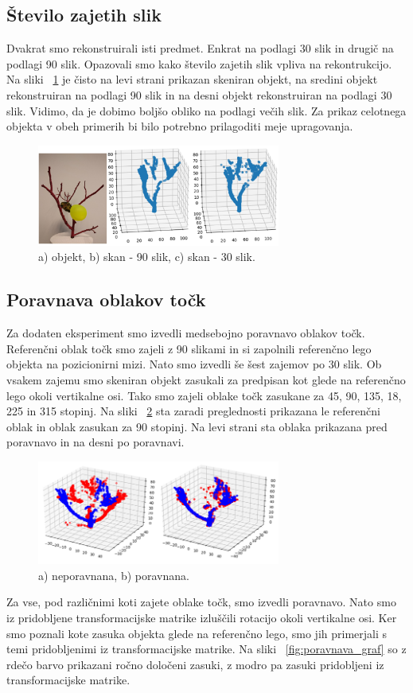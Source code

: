 \documentclass[journal,a4paper,twoside]{sty/IEEEtran}
\begin{document}
\subsection{Število zajetih slik}
Dvakrat smo rekonstruirali isti predmet. Enkrat na podlagi 30 slik in drugič na podlagi 90 slik. Opazovali smo kako število zajetih slik vpliva na rekontrukcijo. Na sliki ~\ref{fig:slika_90_30} je čisto na levi strani prikazan skeniran objekt, na sredini objekt rekonstruiran na podlagi 90 slik in na desni objekt rekonstruiran na podlagi 30 slik. Vidimo, da je dobimo boljšo obliko na podlagi večih slik. Za prikaz celotnega objekta v obeh primerih bi bilo potrebno prilagoditi meje upragovanja. 
%
\begin{figure}[H]
	\centerline{\includegraphics[width=8cm]{fig/slika_90_30}}
	\caption{a) objekt, b) skan - 90 slik, c) skan - 30 slik.}
	\label{fig:slika_90_30}
\end{figure}
%
%
\subsection{Poravnava oblakov točk}
Za dodaten eksperiment smo izvedli medsebojno poravnavo oblakov točk. Referenčni oblak točk smo zajeli z 90 slikami in si zapolnili referenčno lego objekta na pozicionirni mizi. Nato smo izvedli še šest zajemov po 30 slik. Ob vsakem zajemu smo skeniran objekt zasukali za predpisan kot glede na referenčno lego okoli vertikalne osi. Tako smo zajeli oblake točk zasukane za 45, 90, 135, 18, 225 in 315 stopinj. Na sliki ~\ref{fig:poravnava} sta zaradi preglednosti prikazana le referenčni oblak in oblak zasukan za 90 stopinj. Na levi strani sta oblaka prikazana pred poravnavo in na desni po poravnavi. 

\begin{figure}[H]
	\centerline{\includegraphics[width=8cm]{fig/poravnava}}
	\caption{a) neporavnana, b) poravnana.}
	\label{fig:poravnava}
\end{figure}
%
Za vse, pod različnimi koti zajete oblake točk, smo izvedli poravnavo. Nato smo iz pridobljene transformacijske matrike izluščili rotacijo okoli vertikalne osi. Ker smo poznali kote zasuka objekta glede na referenčno lego, smo jih primerjali s temi pridobljenimi iz transformacijske matrike. Na sliki ~\ref{fig:poravnava_graf} so z rdečo barvo prikazani ročno določeni zasuki, z modro pa zasuki pridobljeni iz transformacijske matrike.
\end{document}
